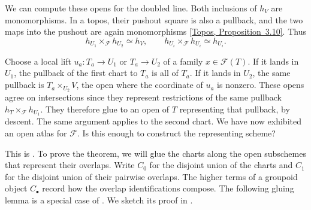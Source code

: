 We can compute these opens for the doubled line. Both inclusions of
$h_V$ are monomorphisms. In a topos, their pushout square is also a
pullback, and the two maps into the pushout are again monomorphisms
\href{https://animarium.org/tag/021Y/}{[Topos, Proposition~3.10]}.
Thus
\[
  h_{U_1}\times_{\mathcal F}h_{U_2}\simeq h_V,
  \qquad
  h_{U_i}\times_{\mathcal F}h_{U_i}\simeq h_{U_i}.
\]

Choose a local lift $u_a\colon T_a\to U_1$ or $T_a\to U_2$ of a family
$x\in\mathcal F(T)$. If it lands in $U_1$, the pullback of the first
chart to $T_a$ is all of $T_a$. If it lands in $U_2$, the same pullback
is $T_a\times_{U_2}V$, the open where the coordinate of $u_a$ is
nonzero. These opens agree on intersections since they represent
restrictions of the same pullback $h_T\times_{\mathcal F}h_{U_1}$.
They therefore glue to an open of $T$ representing that pullback, by
descent. The same argument applies to the second chart. We have now
exhibited an open atlas for $\mathcal F$. Is this enough to construct
the representing scheme?


This is \citet[Proposition~2.1.48]{Steffens_Representability_Elliptic_Moduli}.
To prove the theorem, we will glue the charts along the open subschemes
that represent their overlaps. Write $C_0$ for the disjoint union of the
charts and $C_1$ for the disjoint union of their pairwise overlaps.
The higher terms of a groupoid object $C_\bullet$ record how the
overlap identifications compose. The following gluing lemma is a
special case of \citet[Propositions~2.1.18(2), 2.1.31(5), and~2.1.35(2)]{Steffens_Representability_Elliptic_Moduli}.
We sketch its proof in .


